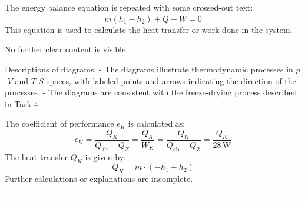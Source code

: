 The energy balance equation is repeated with some crossed-out text:  
\[
\dot{m} (h_1 - h_2) + \dot{Q} - \dot{W} = 0
\]  
This equation is used to calculate the heat transfer or work done in the system.  

No further clear content is visible.  

Descriptions of diagrams:  
- The diagrams illustrate thermodynamic processes in \(p\)-\(V\) and \(T\)-\(S\) spaces, with labeled points and arrows indicating the direction of the processes.  
- The diagrams are consistent with the freeze-drying process described in Task 4.

The coefficient of performance \( \epsilon_K \) is calculated as:  
\[
\epsilon_K = \frac{Q_K}{Q_{\text{ab}} - Q_Z} = \frac{Q_K}{W_K} = \frac{Q_K}{Q_{\text{ab}} - Q_Z} = \frac{Q_K}{28 \, \text{W}}
\]  
The heat transfer \( Q_K \) is given by:  
\[
Q_K = \dot{m} \cdot (-h_1 + h_2)
\]  
Further calculations or explanations are incomplete.

---
